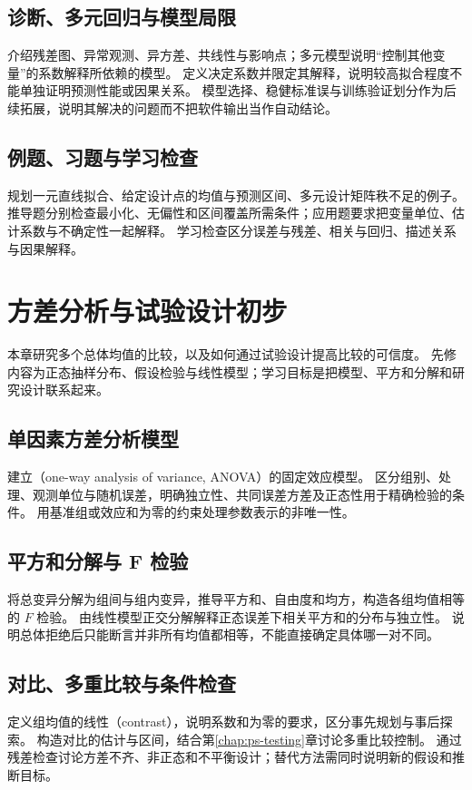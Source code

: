 \documentclass[UTF8,12pt,a4paper,fontset=fandol]{ctexbook}
\begin{document}
\section{诊断、多元回归与模型局限}
\label{sec:ps-regression-diagnostics}
介绍残差图、异常观测、异方差、共线性与影响点；多元模型说明“控制其他变量”的系数解释所依赖的模型。
定义决定系数并限定其解释，说明较高拟合程度不能单独证明预测性能或因果关系。
模型选择、稳健标准误与训练验证划分作为后续拓展，说明其解决的问题而不把软件输出当作自动结论。

\section{例题、习题与学习检查}
规划一元直线拟合、给定设计点的均值与预测区间、多元设计矩阵秩不足的例子。
推导题分别检查最小化、无偏性和区间覆盖所需条件；应用题要求把变量单位、估计系数与不确定性一起解释。
学习检查区分误差与残差、相关与回归、描述关系与因果解释。


\chapter{方差分析与试验设计初步}
\label{chap:ps-anova}

本章研究多个总体均值的比较，以及如何通过试验设计提高比较的可信度。
先修内容为正态抽样分布、假设检验与线性模型；学习目标是把模型、平方和分解和研究设计联系起来。

\section{单因素方差分析模型}
\label{sec:ps-oneway-anova}
建立（one-way analysis of variance, ANOVA）的固定效应模型。
区分组别、处理、观测单位与随机误差，明确独立性、共同误差方差及正态性用于精确检验的条件。
用基准组或效应和为零的约束处理参数表示的非唯一性。

\section{平方和分解与 F 检验}
\label{sec:ps-anova-decomposition}
将总变异分解为组间与组内变异，推导平方和、自由度和均方，构造各组均值相等的 $F$ 检验。
由线性模型正交分解解释正态误差下相关平方和的分布与独立性。
说明总体拒绝后只能断言并非所有均值都相等，不能直接确定具体哪一对不同。

\section{对比、多重比较与条件检查}
\label{sec:ps-anova-contrasts}
定义组均值的线性（contrast），说明系数和为零的要求，区分事先规划与事后探索。
构造对比的估计与区间，结合第\ref{chap:ps-testing}章讨论多重比较控制。
通过残差检查讨论方差不齐、非正态和不平衡设计；替代方法需同时说明新的假设和推断目标。
\end{document}
